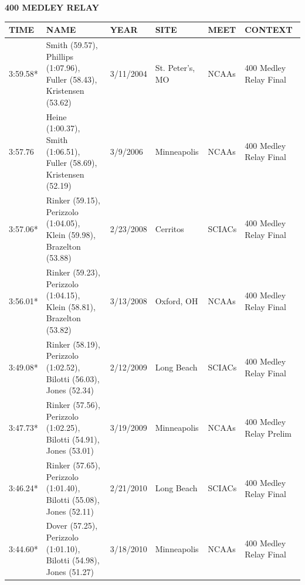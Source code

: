 \begin{table}[H]
\centering
\begin{minipage}[t]{0.6\textwidth}
\centering
\textbf{400 MEDLEY RELAY}\\[0.1cm]
\begin{tabular}{@{}p{1.8cm}p{2.8cm}p{1.2cm}p{1.4cm}p{1.4cm}p{2.0cm}@{}}
\hline
    \textbf{TIME} & \textbf{NAME} & \textbf{YEAR} & \textbf{SITE} & \textbf{MEET} & \textbf{CONTEXT} \\
\hline
    3:59.58* & Smith (59.57), Phillips (1:07.96), Fuller (58.43), Kristensen (53.62) & 3/11/2004 & St. Peter's, MO & NCAAs & 400 Medley Relay Final \\
    3:57.76 & Heine (1:00.37), Smith (1:06.51), Fuller (58.69), Kristensen (52.19) & 3/9/2006 & Minneapolis & NCAAs & 400 Medley Relay Final \\
    3:57.06* & Rinker (59.15), Perizzolo (1:04.05), Klein (59.98), Brazelton (53.88) & 2/23/2008 & Cerritos & SCIACs & 400 Medley Relay Final \\
    3:56.01* & Rinker (59.23), Perizzolo (1:04.15), Klein (58.81), Brazelton (53.82) & 3/13/2008 & Oxford, OH & NCAAs & 400 Medley Relay Final \\
    3:49.08* & Rinker (58.19), Perizzolo (1:02.52), Bilotti (56.03), Jones (52.34) & 2/12/2009 & Long Beach & SCIACs & 400 Medley Relay Final \\
    3:47.73* & Rinker (57.56), Perizzolo (1:02.25), Bilotti (54.91), Jones (53.01) & 3/19/2009 & Minneapolis & NCAAs & 400 Medley Relay Prelim \\
    3:46.24* & Rinker (57.65), Perizzolo (1:01.40), Bilotti (55.08), Jones (52.11) & 2/21/2010 & Long Beach & SCIACs & 400 Medley Relay Final \\
    3:44.60* & Dover (57.25), Perizzolo (1:01.10), Bilotti (54.98), Jones (51.27) & 3/18/2010 & Minneapolis & NCAAs & 400 Medley Relay Final \\
\hline
\end{tabular}
\end{minipage}
\end{table}


\newpage



